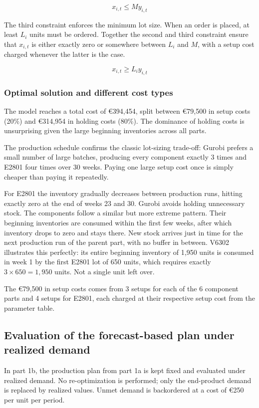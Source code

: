 \documentclass[a4paper,faculty=eb,language=en,doctype=article,sftitles=false]{ugent-doc}
\begin{document}
\[
x_{i,t} \leq M y_{i,t}
\]

The third constraint enforces the minimum lot size. When an order is placed, at least $L_i$ units must be ordered. Together the second and third constraint ensure that $x_{i,t}$ is either exactly zero or somewhere between $L_i$ and $M$, with a setup cost charged whenever the latter is the case.

\[
x_{i,t} \geq L_i y_{i,t}
\]

\subsubsection{Optimal solution and different cost types}

The model reaches a total cost of €394{,}454, split between €79{,}500 in setup costs (20\%) and €314{,}954 in holding costs (80\%). The dominance of holding costs is unsurprising given the large beginning inventories across all parts.

The production schedule confirms the classic lot-sizing trade-off: Gurobi prefers a small number of large batches, producing every component exactly 3 times and E2801 four times over 30 weeks. Paying one large setup cost once is simply cheaper than paying it repeatedly.

For E2801 the inventory gradually decreases between production runs, hitting exactly zero at the end of weeks 23 and 30. Gurobi avoids holding unnecessary stock. The components follow a similar but more extreme pattern. Their beginning inventories are consumed within the first few weeks, after which inventory drops to zero and stays there. New stock arrives just in time for the next production run of the parent part, with no buffer in between. V6302 illustrates this perfectly: its entire beginning inventory of 1{,}950 units is consumed in week 1 by the first E2801 lot of 650 units, which requires exactly $3 \times 650 = 1{,}950$ units. Not a single unit left over.

The €79{,}500 in setup costs comes from 3 setups for each of the 6 component parts and 4 setups for E2801, each charged at their respective setup cost from the parameter table.

\subsection{Evaluation of the forecast-based plan under realized demand}

In part 1b, the production plan from part 1a is kept fixed and evaluated under realized demand. No re-optimization is performed; only the end-product demand is replaced by realized values. Unmet demand is backordered at a cost of €250 per unit per period.
\end{document}
